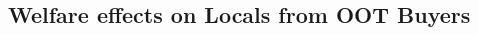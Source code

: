 \documentclass[letterpaper,12pt,dvipsnames,usenames]{article}
\theoremstyle{definition}
\begin{document}
\begin{spacing}{1.25}






\subsection{Welfare effects on Locals from OOT Buyers}


\end{spacing}
\end{document}
